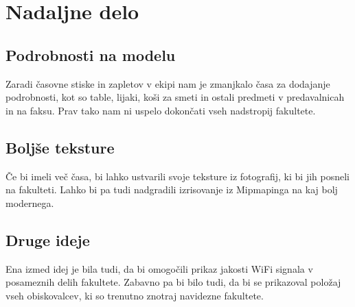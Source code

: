 \documentclass[10pt,a4paper]{article}
\begin{document}
\section{Nadaljne delo}
\subsection{Podrobnosti na modelu}
Zaradi časovne stiske in zapletov v ekipi nam je zmanjkalo časa za dodajanje podrobnosti, kot so 
table, lijaki, koši za smeti in ostali predmeti v predavalnicah in na faksu. Prav
tako nam ni uspelo dokončati vseh nadstropij fakultete. 
\subsection{Boljše teksture}
Če bi imeli več časa, bi lahko ustvarili svoje teksture iz fotografij, ki bi 
jih posneli na fakulteti. Lahko bi pa tudi nadgradili izrisovanje iz Mipmapinga
na kaj bolj modernega. 
\subsection{Druge ideje}
Ena izmed idej je bila tudi, da bi omogočili prikaz jakosti WiFi signala v posameznih delih 
fakultete. Zabavno pa bi bilo tudi, da bi se prikazoval položaj vseh obiskovalcev, ki so trenutno
znotraj navidezne fakultete.
\pagebreak
\end{document}
